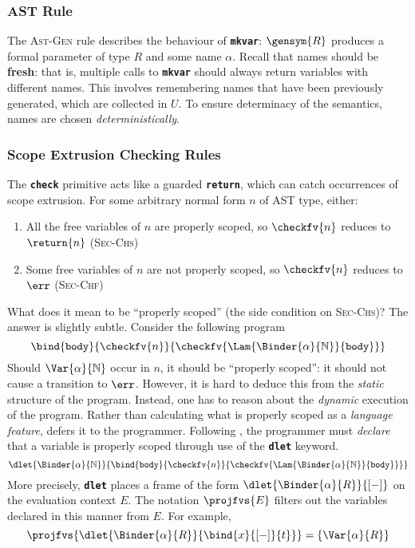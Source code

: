 \subsubsection{AST Rule}
The \textsc{Ast-Gen} rule describes the behaviour of \textbf{\texttt{mkvar}}: $\gensym{R}$ produces a formal parameter of type $R$ and some name $\alpha$. Recall that names should be \textbf{fresh}: that is, multiple calls to \textbf{\texttt{mkvar}} should always return variables with different names. This involves remembering names that have been previously generated, which are collected in $U$. To ensure determinacy of the semantics, names are chosen \textit{deterministically}.


\subsubsection{Scope Extrusion Checking Rules}
The \textbf{\texttt{check}} primitive acts like a guarded \textbf{\texttt{return}}, which can catch occurrences of scope extrusion. For some arbitrary normal form $n$ of AST type, either:
\begin{enumerate}
  \item All the free variables of $n$ are properly scoped, so $\checkfv{n}$ reduces to $\return{n}$ (\textsc{Sec-Chs})
  \item Some free variables of $n$ are not properly scoped, so $\checkfv{n}$ reduces to $\err$ (\textsc{Sec-Chf})
\end{enumerate}
What does it mean to be ``properly scoped'' (the side condition on \textsc{Sec-Chs})? The answer is slightly subtle. Consider the following program 
\[\bind{\texttt{body}}{\checkfv{n}}{\checkfv{\Lam{\Binder{\alpha}{\mathbb{N}}}{\texttt{body}}}}\]
Should $\Var{\alpha}{\mathbb{N}}$ occur in $n$, it should be ``properly scoped'': it should not cause a transition to $\err$. However, it is hard to deduce this from the \textit{static} structure of the program. Instead, one has to reason about the \textit{dynamic} execution of the program. Rather than calculating what is properly scoped as a \textit{language feature}, \coreLang{} defers it to the programmer. Following \citet{kiselyov-2024}, the programmer must \textit{declare} that a variable is properly scoped through use of the \textbf{\texttt{dlet}} keyword. 
\[\dlet{\Binder{\alpha}{\mathbb{N}}}{\bind{\texttt{body}}{\checkfv{n}}{\checkfv{\Lam{\Binder{\alpha}{\mathbb{N}}}{\texttt{body}}}}}\]
More precisely, \textbf{\texttt{dlet}} places a frame of the form $\dlet{\Binder{\alpha}{R}}{[-]}$ on the evaluation context $E$. The notation $\projfvs{E}$ filters out the variables declared in this manner from $E$. For example,
\[\projfvs{\dlet{\Binder{\alpha}{R}}{\bind{x}{[-]}{t}}} = \{ \Var{\alpha}{R} \}\]

